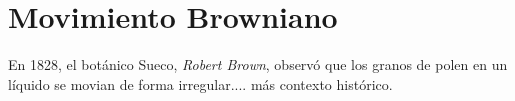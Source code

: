 \chapter{Movimiento Browniano}


En 1828, el botánico Sueco, \textit{Robert Brown}, observó que los granos de polen en un líquido se movian de forma irregular.... más contexto histórico.















